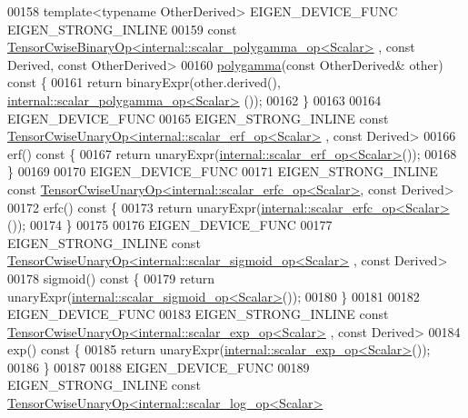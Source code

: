 \begin{DoxyCode}
00158     \textcolor{keyword}{template}<\textcolor{keyword}{typename} OtherDerived> EIGEN\_DEVICE\_FUNC EIGEN\_STRONG\_INLINE
00159     \textcolor{keyword}{const} \hyperlink{class_eigen_1_1_tensor_cwise_binary_op}{TensorCwiseBinaryOp<internal::scalar\_polygamma\_op<Scalar>}
      , \textcolor{keyword}{const} Derived, \textcolor{keyword}{const} OtherDerived>
00160     \hyperlink{namespace_eigen_ae3b47a13a0699f5dbaa0623c11333dca}{polygamma}(\textcolor{keyword}{const} OtherDerived& other)\textcolor{keyword}{ const }\{
00161       \textcolor{keywordflow}{return} binaryExpr(other.derived(), \hyperlink{struct_eigen_1_1internal_1_1scalar__polygamma__op}{internal::scalar\_polygamma\_op<Scalar>}
      ());
00162     \}
00163 
00164     EIGEN\_DEVICE\_FUNC
00165     EIGEN\_STRONG\_INLINE \textcolor{keyword}{const} \hyperlink{class_eigen_1_1_tensor_cwise_unary_op}{TensorCwiseUnaryOp<internal::scalar\_erf\_op<Scalar>}
      , \textcolor{keyword}{const} Derived>
00166     erf()\textcolor{keyword}{ const }\{
00167       \textcolor{keywordflow}{return} unaryExpr(\hyperlink{struct_eigen_1_1internal_1_1scalar__erf__op}{internal::scalar\_erf\_op<Scalar>}());
00168     \}
00169 
00170     EIGEN\_DEVICE\_FUNC
00171     EIGEN\_STRONG\_INLINE \textcolor{keyword}{const} 
      \hyperlink{class_eigen_1_1_tensor_cwise_unary_op}{TensorCwiseUnaryOp<internal::scalar\_erfc\_op<Scalar>}, \textcolor{keyword}{
      const} Derived>
00172     erfc()\textcolor{keyword}{ const }\{
00173       \textcolor{keywordflow}{return} unaryExpr(\hyperlink{struct_eigen_1_1internal_1_1scalar__erfc__op}{internal::scalar\_erfc\_op<Scalar>}());
00174     \}
00175 
00176     EIGEN\_DEVICE\_FUNC
00177     EIGEN\_STRONG\_INLINE \textcolor{keyword}{const} 
      \hyperlink{class_eigen_1_1_tensor_cwise_unary_op}{TensorCwiseUnaryOp<internal::scalar\_sigmoid\_op<Scalar>}
      , \textcolor{keyword}{const} Derived>
00178     sigmoid()\textcolor{keyword}{ const }\{
00179       \textcolor{keywordflow}{return} unaryExpr(\hyperlink{struct_eigen_1_1internal_1_1scalar__sigmoid__op}{internal::scalar\_sigmoid\_op<Scalar>}());
00180     \}
00181 
00182     EIGEN\_DEVICE\_FUNC
00183     EIGEN\_STRONG\_INLINE \textcolor{keyword}{const} \hyperlink{class_eigen_1_1_tensor_cwise_unary_op}{TensorCwiseUnaryOp<internal::scalar\_exp\_op<Scalar>}
      , \textcolor{keyword}{const} Derived>
00184     exp()\textcolor{keyword}{ const }\{
00185       \textcolor{keywordflow}{return} unaryExpr(\hyperlink{struct_eigen_1_1internal_1_1scalar__exp__op}{internal::scalar\_exp\_op<Scalar>}());
00186     \}
00187 
00188     EIGEN\_DEVICE\_FUNC
00189     EIGEN\_STRONG\_INLINE \textcolor{keyword}{const} \hyperlink{class_eigen_1_1_tensor_cwise_unary_op}{TensorCwiseUnaryOp<internal::scalar\_log\_op<Scalar>}

\end{DoxyCode}
